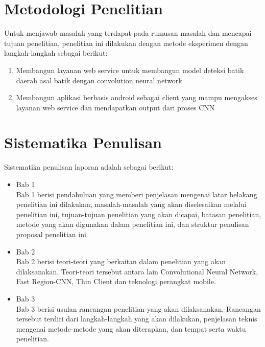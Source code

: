 \section{Metodologi Penelitian}
Untuk menjawab masalah yang terdapat pada rumusan masalah dan mencapai tujuan penelitian, penelitian ini dilakukan dengan metode eksperimen dengan langkah-langkah sebagai berikut:
\begin{enumerate}
	\item Membangun layanan web service untuk membangun model deteksi batik daerah asal batik dengan convolution neural network
	\item Membangun aplikasi berbasis android sebagai client yang mampu mengakses layanan web service dan mendapatkan output dari proses CNN
\end{enumerate}

\section{Sistematika Penulisan}
Sistematika penulisan laporan adalah sebagai berikut:
\begin{itemize}
	\item Bab 1 \babSatu \\
	Bab 1 berisi pendahuluan yang memberi penjelasan mengenai latar belakang penelitian ini dilakukan, masalah-masalah yang akan diselesaikan melalui penelitian ini, tujuan-tujuan penelitian yang akan dicapai, batasan penelitian, metode yang akan digunakan dalam penelitian ini, dan struktur penulisan proposal penelitian ini.
	\item Bab 2 \babDua \\
	Bab 2 berisi teori-teori yang berkaitan dalam penelitian yang akan dilaksanakan. Teori-teori tersebut antara lain Convolutional Neural Network, Fast Region-CNN, Thin Client dan teknologi perangkat mobile.
	\item Bab 3 \babTiga \\
	Bab 3 berisi usulan rancangan penelitian yang akan dilaksanakan. Rancangan tersebut terdiri dari langkah-langkah yang akan dilakukan, penjelasan teknis mengenai metode-metode yang akan diterapkan, dan tempat serta waktu penelitian.
\end{itemize}


